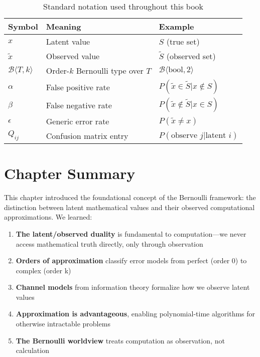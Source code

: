 \begin{table}[h]
\centering
\begin{tabular}{|l|l|l|}
\hline
\textbf{Symbol} & \textbf{Meaning} & \textbf{Example} \\
\hline
$x$ & Latent value & $S$ (true set) \\
$\tilde{x}$ & Observed value & $\tilde{S}$ (observed set) \\
$\mathcal{B}\langle T, k \rangle$ & Order-$k$ Bernoulli type over $T$ & $\mathcal{B}\langle\text{bool}, 2\rangle$ \\
$\alpha$ & False positive rate & $P(\tilde{x} \in \tilde{S} | x \notin S)$ \\
$\beta$ & False negative rate & $P(\tilde{x} \notin \tilde{S} | x \in S)$ \\
$\epsilon$ & Generic error rate & $P(\tilde{x} \neq x)$ \\
$Q_{ij}$ & Confusion matrix entry & $P(\text{observe } j | \text{latent } i)$ \\
\hline
\end{tabular}
\caption{Standard notation used throughout this book}
\end{table}

\section{Chapter Summary}

This chapter introduced the foundational concept of the Bernoulli framework: the distinction between latent mathematical values and their observed computational approximations. We learned:

\begin{enumerate}
\item \textbf{The latent/observed duality} is fundamental to computation—we never access mathematical truth directly, only through observation
\item \textbf{Orders of approximation} classify error models from perfect (order 0) to complex (order k)
\item \textbf{Channel models} from information theory formalize how we observe latent values
\item \textbf{Approximation is advantageous}, enabling polynomial-time algorithms for otherwise intractable problems
\item \textbf{The Bernoulli worldview} treats computation as observation, not calculation
\end{enumerate}

